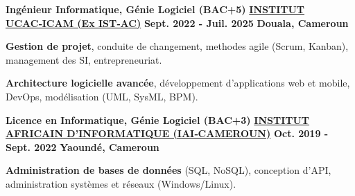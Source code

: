 

\begin{cventries}

  \cventry
    {\textbf{Ingénieur Informatique, Génie Logiciel (BAC+5) }} %
    {\textbf{\href{https://ucac-icam.com/}{INSTITUT UCAC‑ICAM (Ex IST‑AC)}}}  %
    {\textbf{Sept. 2022 - Juil. 2025}} %
    {\textbf{Douala, Cameroun}} %
    {
      \begin{cvitems} %
        \item {\textbf{Gestion de projet}, conduite de changement, methodes agile (Scrum, Kanban), management des SI, entrepreneuriat.}
        \item {\textbf{Architecture logicielle avancée}, développement d'applications web et mobile, DevOps, modélisation (UML, SysML, BPM).}
      \end{cvitems}
    }
  \cventry
    {\textbf{Licence en Informatique, Génie Logiciel (BAC+3)} } %
    {\textbf{\href{https://www.iai-siege.com/}{INSTITUT AFRICAIN D’INFORMATIQUE (IAI‑CAMEROUN)}}} %
    {\textbf{Oct. 2019 - Sept. 2022}} %
    {\textbf{Yaoundé, Cameroun}} %
    {
      \begin{cvitems} %
        \item {\textbf{Administration de bases de données} (SQL, NoSQL), conception d'API, administration systèmes et réseaux (Windows/Linux). }
      \end{cvitems}
    }
\end{cventries}